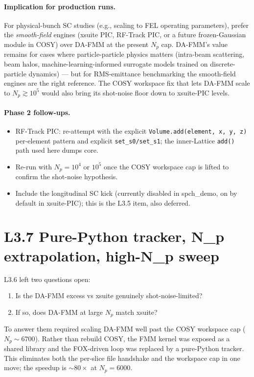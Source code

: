 \documentclass[11pt]{article}
\begin{document}
\paragraph{Implication for production runs.}
For physical-bunch SC studies (e.g., scaling to FEL operating
parameters), prefer the \emph{smooth-field} engines (xsuite PIC,
RF-Track PIC, or a future frozen-Gaussian module in COSY) over
DA-FMM at the present $N_p$ cap. DA-FMM's value remains for cases
where particle-particle physics matters (intra-beam scattering,
beam halos, machine-learning-informed surrogate models trained on
discrete-particle dynamics) --- but for RMS-emittance benchmarking
the smooth-field engines are the right reference. The COSY workspace
fix that lets DA-FMM scale to $N_p \gtrsim 10^5$ would also bring its
shot-noise floor down to xsuite-PIC levels.

\paragraph{Phase 2 follow-ups.}
\begin{itemize}
\item RF-Track PIC: re-attempt with the explicit
      \texttt{Volume.add(element, x, y, z)} per-element pattern
      and explicit \texttt{set\_s0/set\_s1}; the inner-Lattice
      \texttt{add()} path used here dumps core.
\item Re-run with $N_p=10^4$ or $10^5$ once the COSY workspace cap
      is lifted to confirm the shot-noise hypothesis.
\item Include the longitudinal SC kick (currently disabled in
      spch\_demo, on by default in xsuite-PIC); this is the L3.5
      item, also deferred.
\end{itemize}

\section{L3.7 Pure-Python tracker, N\_p extrapolation, high-N\_p sweep}

L3.6 left two questions open:
\begin{enumerate}
\item Is the DA-FMM excess vs xsuite genuinely shot-noise-limited?
\item If so, does DA-FMM at large $N_p$ match xsuite?
\end{enumerate}

To answer them required scaling DA-FMM well past the COSY workspace
cap ($N_p \sim 6700$). Rather than rebuild COSY, the FMM kernel was
exposed as a shared library and the FOX-driven loop was replaced by a
pure-Python tracker. This eliminates both the per-slice file
handshake and the workspace cap in one move; the speedup is
$\sim 80\times$ at $N_p=6000$.
\end{document}
